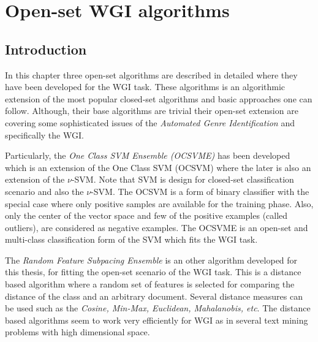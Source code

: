 
\chapter{Open-set WGI algorithms}

\label{chap:openset}


\newcommand{\keyword}[1]{\textbf{#1}}
\newcommand{\tabhead}[1]{\textbf{#1}}
\newcommand{\code}[1]{\texttt{#1}}
\newcommand{\file}[1]{\texttt{\bfseries#1}}
\newcommand{\option}[1]{\texttt{\itshape#1}}


\section{Introduction}\label{chap:openset:sec:intro}


In this chapter three open-set algorithms are described in detailed where they have been developed for the WGI task. These algorithms is an algorithmic extension of the most popular closed-set algorithms and basic approaches one can follow. Although, their base algorithms are trivial their open-set extension are covering some sophisticated issues of the \textit{Automated Genre Identification} and specifically the WGI. 

Particularly, the \textit{One Class SVM Ensemble (OCSVME)} has been developed which is an extension of the One Class SVM (OCSVM) where the later is also an extension of the $\nu$-SVM. Note that SVM is design for closed-set classification scenario and also the $\nu$-SVM. The OCSVM is a form of binary classifier with the special case where only positive samples are available for the training phase. Also, only the center of the vector space and few of the positive examples (called outliers), are considered as negative examples. The OCSVME is an open-set and multi-class classification form of the SVM which fits the WGI task. 

The \textit{Random Feature Subpacing Ensemble} is an other algorithm developed for this thesis, for fitting the open-set scenario of the WGI task. This is a distance based algorithm where a random set of features is selected for comparing the distance of the class and an arbitrary document. Several distance measures can be used such as the \textit{Cosine, Min-Max, Euclidean, Mahalanobis, etc}. The distance based algorithms seem to work very efficiently for WGI as in several text mining problems with high dimensional space.

